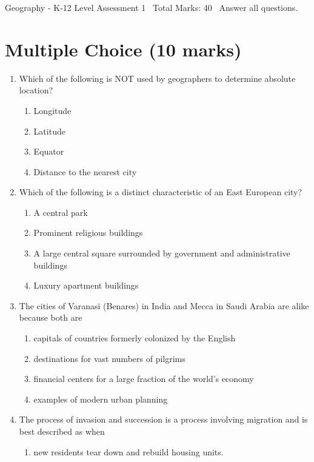 \documentclass[12pt]{article}
\begin{document}
\begin{center}
Geography - K-12 Level Assessment 1 \
Total Marks: 40 \
Answer all questions.
\end{center}

\section*{Multiple Choice (10 marks)}
\begin{enumerate}[label=\arabic*.]
\item Which of the following is NOT used by geographers to determine absolute location?
\begin{enumerate}[label=(\alph*)]
    \item Longitude
    \item Latitude
    \item Equator
    \item Distance to the nearest city
\end{enumerate}
\item Which of the following is a distinct characteristic of an East European city?
\begin{enumerate}[label=(\alph*)]
    \item A central park
    \item Prominent religious buildings
    \item A large central square surrounded by government and administrative buildings
    \item Luxury apartment buildings
\end{enumerate}
\item The cities of Varanasi (Benares) in India and Mecca in Saudi Arabia are alike because both are
\begin{enumerate}[label=(\alph*)]
    \item capitals of countries formerly colonized by the English
    \item destinations for vast numbers of pilgrims
    \item financial centers for a large fraction of the world's economy
    \item examples of modern urban planning
\end{enumerate}
\item The process of invasion and succession is a process involving migration and is best described as when
\begin{enumerate}[label=(\alph*)]
    \item new residents tear down and rebuild housing units.

\end{enumerate}
\end{enumerate}
\end{document}
